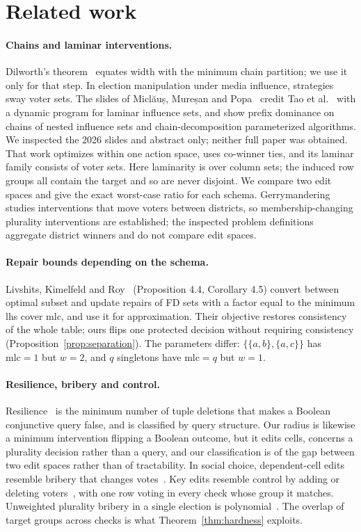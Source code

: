 \documentclass[11pt]{article}
\theoremstyle{remark}
\begin{document}
\section{Related work}\label{sec:related}
\paragraph{Chains and laminar interventions.}
Dilworth's theorem~\cite{dilworth} equates width with the minimum chain
partition; we use it only for that step. In election manipulation under media
influence, strategies sway voter sets. The slides of Miclăuș, Mureșan and
Popa~\cite{emmi2026} credit Tao et al.~\cite{emmi2021} with a dynamic program
for laminar influence sets, and show prefix dominance on chains of nested
influence sets and chain-decomposition parameterized algorithms. We inspected
the 2026 slides and abstract only; neither full paper was obtained. That work optimizes within
one action space, uses co-winner ties, and its laminar family consists of voter
sets. Here laminarity is over column sets; the induced row groups all contain
the target and so are never disjoint. We compare two edit spaces and give the
exact worst-case ratio for each schema. Gerrymandering~\cite{dey} studies
interventions that move voters between districts, so membership-changing
plurality interventions are established; the inspected problem definitions
aggregate district winners and do not compare edit spaces.

\paragraph{Repair bounds depending on the schema.}
Livshits, Kimelfeld and Roy~\cite{livshits} (Proposition 4.4, Corollary 4.5)
convert between optimal subset and update repairs of FD sets with a factor
equal to the minimum lhs cover $\mathrm{mlc}$, and use it for approximation.
Their objective restores consistency of the whole table; ours flips one
protected decision without requiring consistency
(Proposition~\ref{prop:separation}). The parameters differ: $\{\{a,b\},\{a,c\}\}$
has $\mathrm{mlc}=1$ but $w=2$, and $q$ singletons have $\mathrm{mlc}=q$ but $w=1$.

\paragraph{Resilience, bribery and control.}
Resilience~\cite{resilience} is the minimum number of tuple deletions that
makes a Boolean conjunctive query false, and is classified by query structure.
Our radius is likewise a minimum intervention flipping a Boolean outcome, but
it edits cells, concerns a plurality decision rather than a query, and our
classification is of the gap between two edit spaces rather than of
tractability. In social choice, dependent-cell edits resemble bribery that
changes votes~\cite{bribery}. Key edits resemble control by adding or deleting
voters~\cite{control}, with one row voting in every check whose group it
matches. Unweighted plurality bribery in a single election is
polynomial~\cite{bribery}. The overlap of target groups across checks is what
Theorem~\ref{thm:hardness} exploits.
\end{document}
